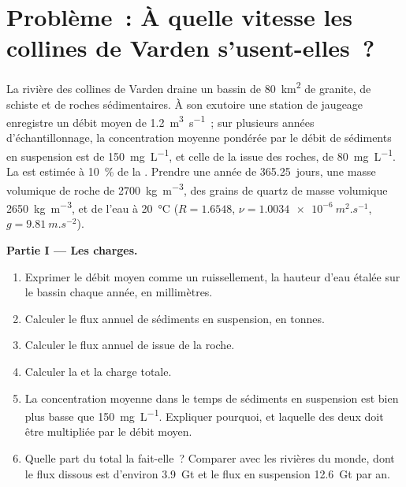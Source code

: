 \section{Problème~: À quelle vitesse les collines de Varden s'usent-elles~?}

\begin{problem}
\label{pb:b1:erosion-transport:1}
La rivière des collines de Varden draine un bassin de \qty{80}{km^2} de granite,
de schiste et de roches sédimentaires. À son exutoire une station de jaugeage enregistre un débit
moyen de \qty{1.2}{m^3.s^{-1}}~; sur plusieurs années d'échantillonnage, la
concentration moyenne pondérée par le débit de sédiments en suspension est de \qty{150}{mg.L^{-1}},
et celle de la  issue des roches, de \qty{80}{mg.L^{-1}}.
La  est estimée à \qty{10}{\percent} de la . Prendre une
année de \num{365.25}~jours, une masse volumique de roche de \qty{2700}{kg.m^{-3}}, des grains de quartz
de masse volumique \qty{2650}{kg.m^{-3}}, et de l'eau à \qty{20}{\celsius} ($R
= 1.6548$, $\nu = \qty{1.0034e-6}{m^2.s^{-1}}$, $g = \qty{9.81}{m.s^{-2}}$).

\medskip
\noindent\textbf{Partie I --- Les charges.}
\begin{enumerate}
  \item Exprimer le débit moyen comme un ruissellement, la hauteur d'eau étalée
        sur le bassin chaque année, en millimètres.
  \item Calculer le flux annuel de sédiments en suspension, en tonnes.
  \item Calculer le flux annuel de  issue de la roche.
  \item Calculer la  et la charge totale.
  \item La concentration moyenne dans le temps de sédiments en suspension est bien plus basse
        que \qty{150}{mg.L^{-1}}. Expliquer pourquoi, et laquelle des deux doit être
        multipliée par le débit moyen.
  \item Quelle part du total la  fait-elle~? Comparer avec
        les rivières du monde, dont le flux dissous est d'environ
        \qty{3.9}{Gt} et le flux en suspension \qty{12.6}{Gt} par an.
\end{enumerate}


\end{problem}
